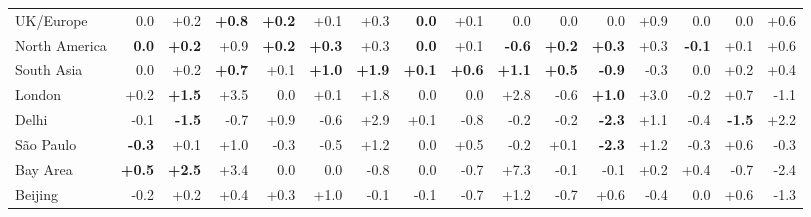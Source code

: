 \begin{table}[tbp]
\begin{tabular}{lrrrrrrrrrrrrrrr}
UK/Europe & 0.0 & +0.2 & \textbf{+0.8} & \textbf{+0.2} & +0.1 & +0.3 & \textbf{0.0} & +0.1 & 0.0 & 0.0 & 0.0 & +0.9 & 0.0 & 0.0 & +0.6 \\
North America & \textbf{0.0} & \textbf{+0.2} & +0.9 & \textbf{+0.2} & \textbf{+0.3} & +0.3 & \textbf{0.0} & +0.1 & \textbf{-0.6} & \textbf{+0.2} & \textbf{+0.3} & +0.3 & \textbf{-0.1} & +0.1 & +0.6 \\
South Asia & 0.0 & +0.2 & \textbf{+0.7} & +0.1 & \textbf{+1.0} & \textbf{+1.9} & \textbf{+0.1} & \textbf{+0.6} & \textbf{+1.1} & \textbf{+0.5} & \textbf{-0.9} & -0.3 & 0.0 & +0.2 & +0.4 \\
London & +0.2 & \textbf{+1.5} & +3.5 & 0.0 & +0.1 & +1.8 & 0.0 & 0.0 & +2.8 & -0.6 & \textbf{+1.0} & +3.0 & -0.2 & +0.7 & -1.1 \\
Delhi & -0.1 & \textbf{-1.5} & -0.7 & +0.9 & -0.6 & +2.9 & +0.1 & -0.8 & -0.2 & -0.2 & \textbf{-2.3} & +1.1 & -0.4 & \textbf{-1.5} & +2.2 \\
São Paulo & \textbf{-0.3} & +0.1 & +1.0 & -0.3 & -0.5 & +1.2 & 0.0 & +0.5 & -0.2 & +0.1 & \textbf{-2.3} & +1.2 & -0.3 & +0.6 & -0.3 \\
Bay Area & \textbf{+0.5} & \textbf{+2.5} & +3.4 & 0.0 & 0.0 & -0.8 & 0.0 & -0.7 & +7.3 & -0.1 & -0.1 & +0.2 & +0.4 & -0.7 & -2.4 \\
Beijing & -0.2 & +0.2 & +0.4 & +0.3 & +1.0 & -0.1 & -0.1 & -0.7 & +1.2 & -0.7 & +0.6 & -0.4 & 0.0 & +0.6 & -1.3 \\
\bottomrule
\end{tabular}
\end{table}
